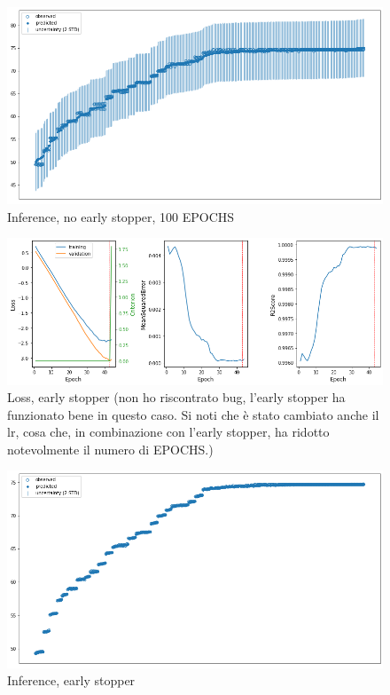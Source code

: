 \newpage


\begin{figure}[h]
    \centering
    \includegraphics[width=1\textwidth]{images/Training - temp/DBP - inference.png}
    \caption{Inference, no early stopper, 100 EPOCHS}
\end{figure}



\newpage


\begin{figure}[h]
    \centering
    \includegraphics[width=1\textwidth]{images/Training - temp/DBP - loss - early stopper.png}
    \caption{Loss, early stopper (non ho riscontrato bug, l'early stopper ha funzionato bene in questo caso. Si noti che è stato cambiato anche il lr, cosa che, in combinazione con l'early stopper, ha ridotto notevolmente il numero di EPOCHS.)}
\end{figure}


\newpage


\begin{figure}[h]
    \centering
    \includegraphics[width=1\textwidth]{images/Training - temp/DBP - inference - early stopper.png}
    \caption{Inference, early stopper}
\end{figure}


